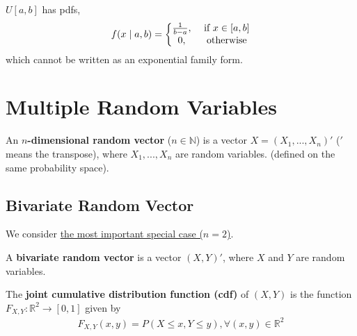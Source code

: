 \documentclass[11pt]{elegantbook}
\begin{document}
\begin{example}
    $U[a,b]$ has pdfs,
    \begin{equation}
        \begin{aligned}
            f(x\mid a,b)=\left\{\begin{matrix}
                \frac{1}{b-a},& \textnormal{ if }x\in [a,b]\\
                0,& \textnormal{ otherwise}
            \end{matrix}\right.
        \end{aligned}
        \nonumber
    \end{equation}
    which cannot be written as an exponential family form.
\end{example}


\section{Multiple Random Variables}
\begin{definition}
    \normalfont
    An \textbf{$n$-dimensional random vector} ($n\in \mathbb{N}$) is a vector $X=\left(X_1,...,X_n\right)'$ ($'$ means the transpose), where $X_1,...,X_n$ are random variables. (defined on the same probability space).
\end{definition}

\subsection{Bivariate Random Vector}
We consider \underline{the most important special case ($n=2$)}.
\begin{definition}
    \normalfont
    A \textbf{bivariate random vector} is a vector $(X,Y)'$, where $X$ and $Y$ are random variables.
\end{definition}

\begin{definition}
    \normalfont
    The \textbf{joint cumulative distribution function (cdf)} of $(X,Y)$ is the function $F_{X,Y}:\mathbb{R}^2 \rightarrow [0,1]$ given by
    \begin{equation}
        \begin{aligned}
            F_{X,Y}(x,y)=P(X\leq x, Y\leq y), \forall (x,y)\in \mathbb{R}^2
        \end{aligned}
        \nonumber
    \end{equation}
\end{definition}
\end{document}
